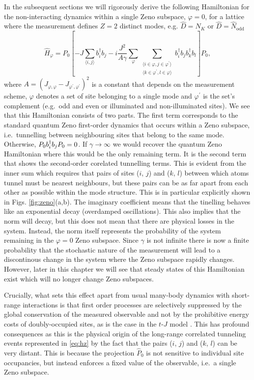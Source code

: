 In the subsequent sections we will rigorously derive the following
Hamiltonian for the non-interacting dynamics within a single Zeno
subspace, $\varphi = 0$, for a lattice where the measurement defines
$Z = 2$ distinct modes, e.g. $\hat{D} = \hat{N}_K$ or
$\hat{D} = \hat{N}_\mathrm{odd}$
\begin{equation}
  \label{eq:hz}
  \hat{H}_\varphi = P_0 \left[ -J \sum_{\langle i, j \rangle}
    b^\dagger_i b_j - i \frac{J^2} {A \gamma} \sum_{\varphi} 
    \sum_{\substack{\langle i \in \varphi, j \in \varphi^\prime
        \rangle \\ \langle k \in \varphi^\prime, l \in \varphi
        \rangle}} b^\dagger_i b_j b^\dagger_k b_l \right] P_0,
\end{equation}
where
$A = (J_{\varphi,\varphi} - J_{\varphi^\prime,\varphi^\prime})^2$ is a
constant that depends on the measurement scheme, $\varphi$ denotes a
set of site belonging to a single mode and $\varphi^\prime$ is the
set's complement (e.g.~odd and even or illuminated and non-illuminated
sites). We see that this Hamiltonian consists of two parts. The first
term corresponds to the standard quantum Zeno first-order dynamics
that occurs within a Zeno subspace, i.e.~tunnelling between
neighbouring sites that belong to the same mode. Otherwise,
$P_0 b^\dagger_i b_j P_0 = 0$. If $\gamma \rightarrow \infty$ we would
recover the quantum Zeno Hamiltonian where this would be the only
remaining term. It is the second term that shows the second-order
corelated tunnelling terms. This is evident from the inner sum which
requires that pairs of sites ($i$, $j$) and ($k$, $l$) between which
atoms tunnel must be nearest neighbours, but these pairs can be as far
apart from each other as possible within the mode structure. This is
in particular explicitly shown in Figs. \ref{fig:zeno}(a,b). The
imaginary coefficient means that the tinelling behaves like an
exponential decay (overdamped oscillations). This also implies that
the norm will decay, but this does not mean that there are physical
losses in the system. Instead, the norm itself represents the
probability of the system remaining in the $\varphi = 0$ Zeno
subspace. Since $\gamma$ is not infinite there is now a finite
probability that the stochastic nature of the measurement will lead to
a discontinous change in the system where the Zeno subspace rapidly
changes. However, later in this chapter we will see that steady states
of this Hamiltonian exist which will no longer change Zeno subspaces.

Crucially, what sets this effect apart from usual many-body dynamics
with short-range interactions is that first order processes are
selectively suppressed by the global conservation of the measured
observable and not by the prohibitive energy costs of doubly-occupied
sites, as is the case in the $t$-$J$ model \cite{auerbach}. This has
profound consequences as this is the physical origin of the long-range
correlated tunneling events represented in \eqref{eq:hz} by the fact
that the pairs ($i$, $j$) and ($k$, $l$) can be very distant. This is
because the projection $\hat{P}_0$ is not sensitive to individual site
occupancies, but instead enforces a fixed value of the observable,
i.e.~a single Zeno subspace.


